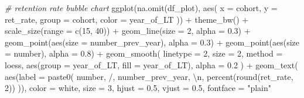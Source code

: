 \documentclass[
]{book}
\newenvironment{Shaded}{\begin{snugshade}}{\end{snugshade}}
\newcommand{\AttributeTok}[1]{\textcolor[rgb]{0.77,0.63,0.00}{#1}}
\newcommand{\CommentTok}[1]{\textcolor[rgb]{0.56,0.35,0.01}{\textit{#1}}}
\newcommand{\DecValTok}[1]{\textcolor[rgb]{0.00,0.00,0.81}{#1}}
\newcommand{\FloatTok}[1]{\textcolor[rgb]{0.00,0.00,0.81}{#1}}
\newcommand{\FunctionTok}[1]{\textcolor[rgb]{0.00,0.00,0.00}{#1}}
\newcommand{\NormalTok}[1]{#1}
\newcommand{\SpecialCharTok}[1]{\textcolor[rgb]{0.00,0.00,0.00}{#1}}
\newcommand{\StringTok}[1]{\textcolor[rgb]{0.31,0.60,0.02}{#1}}
\begin{document}
\begin{Shaded}
\begin{Highlighting}[]
\CommentTok{\# retention rate bubble chart}
\FunctionTok{ggplot}\NormalTok{(}\FunctionTok{na.omit}\NormalTok{(df\_plot),}
       \FunctionTok{aes}\NormalTok{(}
           \AttributeTok{x =}\NormalTok{ cohort,}
           \AttributeTok{y =}\NormalTok{ ret\_rate,}
           \AttributeTok{group =}\NormalTok{ cohort,}
           \AttributeTok{color =}\NormalTok{ year\_of\_LT}
\NormalTok{       )) }\SpecialCharTok{+}
    \FunctionTok{theme\_bw}\NormalTok{() }\SpecialCharTok{+}
    \FunctionTok{scale\_size}\NormalTok{(}\AttributeTok{range =} \FunctionTok{c}\NormalTok{(}\DecValTok{15}\NormalTok{, }\DecValTok{40}\NormalTok{)) }\SpecialCharTok{+}
    \FunctionTok{geom\_line}\NormalTok{(}\AttributeTok{size =} \DecValTok{2}\NormalTok{, }\AttributeTok{alpha =} \FloatTok{0.3}\NormalTok{) }\SpecialCharTok{+}
    \FunctionTok{geom\_point}\NormalTok{(}\FunctionTok{aes}\NormalTok{(}\AttributeTok{size =}\NormalTok{ number\_prev\_year), }\AttributeTok{alpha =} \FloatTok{0.3}\NormalTok{) }\SpecialCharTok{+}
    \FunctionTok{geom\_point}\NormalTok{(}\FunctionTok{aes}\NormalTok{(}\AttributeTok{size =}\NormalTok{ number), }\AttributeTok{alpha =} \FloatTok{0.8}\NormalTok{) }\SpecialCharTok{+}
    \FunctionTok{geom\_smooth}\NormalTok{(}
        \AttributeTok{linetype =} \DecValTok{2}\NormalTok{,}
        \AttributeTok{size =} \DecValTok{2}\NormalTok{,}
        \AttributeTok{method =} \StringTok{\textquotesingle{}loess\textquotesingle{}}\NormalTok{,}
        \FunctionTok{aes}\NormalTok{(}\AttributeTok{group =}\NormalTok{ year\_of\_LT, }\AttributeTok{fill =}\NormalTok{ year\_of\_LT),}
        \AttributeTok{alpha =} \FloatTok{0.2}
\NormalTok{    ) }\SpecialCharTok{+}
    \FunctionTok{geom\_text}\NormalTok{(}
        \FunctionTok{aes}\NormalTok{(}\AttributeTok{label =} \FunctionTok{paste0}\NormalTok{(}
\NormalTok{            number, }\StringTok{\textquotesingle{}/\textquotesingle{}}\NormalTok{, number\_prev\_year, }\StringTok{\textquotesingle{}}\SpecialCharTok{\textbackslash{}n}\StringTok{\textquotesingle{}}\NormalTok{, }\FunctionTok{percent}\NormalTok{(}\FunctionTok{round}\NormalTok{(ret\_rate, }\DecValTok{2}\NormalTok{))}
\NormalTok{        )),}
        \AttributeTok{color =} \StringTok{\textquotesingle{}white\textquotesingle{}}\NormalTok{,}
        \AttributeTok{size =} \DecValTok{3}\NormalTok{,}
        \AttributeTok{hjust =} \FloatTok{0.5}\NormalTok{,}
        \AttributeTok{vjust =} \FloatTok{0.5}\NormalTok{,}
        \AttributeTok{fontface =} \StringTok{"plain"}

\end{Highlighting}
\end{Shaded}
\end{document}
